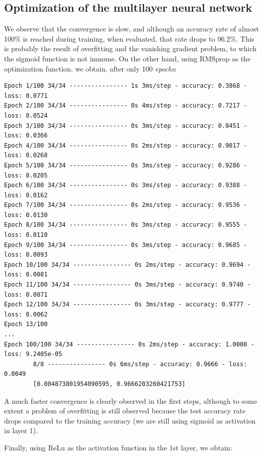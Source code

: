 \documentclass[11pt,a4paper]{article}
\begin{document}
\subsection{Optimization of the multilayer neural network}
We observe that the convergence is slow, and although an accuracy rate of almost 100\% is reached during training, when evaluated, that rate drops to 96.2\%. This is probably the result of overfitting and the vanishing gradient problem, to which the sigmoid function is not immune. On the other hand, using RMSprop as the optimization function, we obtain, after only 100 \textit{epochs}:

{\footnotesize \begin{verbatim}Epoch 1/100 34/34 ---------------- 1s 3ms/step - accuracy: 0.3868 - loss: 0.0771 
Epoch 2/100 34/34 ---------------- 0s 4ms/step - accuracy: 0.7217 - loss: 0.0524
Epoch 3/100 34/34 ---------------- 0s 3ms/step - accuracy: 0.8451 - loss: 0.0366
Epoch 4/100 34/34 ---------------- 0s 2ms/step - accuracy: 0.9017 - loss: 0.0268
Epoch 5/100 34/34 ---------------- 0s 3ms/step - accuracy: 0.9286 - loss: 0.0205
Epoch 6/100 34/34 ---------------- 0s 3ms/step - accuracy: 0.9388 - loss: 0.0162
Epoch 7/100 34/34 ---------------- 0s 2ms/step - accuracy: 0.9536 - loss: 0.0130
Epoch 8/100 34/34 ---------------- 0s 3ms/step - accuracy: 0.9555 - loss: 0.0110
Epoch 9/100 34/34 ---------------- 0s 3ms/step - accuracy: 0.9685 - loss: 0.0093
Epoch 10/100 34/34 ---------------- 0s 2ms/step - accuracy: 0.9694 - loss: 0.0081
Epoch 11/100 34/34 ---------------- 0s 3ms/step - accuracy: 0.9740 - loss: 0.0071
Epoch 12/100 34/34 ---------------- 0s 3ms/step - accuracy: 0.9777 - loss: 0.0062
Epoch 13/100 
...
Epoch 100/100 34/34 ---------------- 0s 2ms/step - accuracy: 1.0000 - loss: 9.2405e-05
        8/8 ---------------- 0s 6ms/step - accuracy: 0.9666 - loss: 0.0049  
        [0.004873801954090595, 0.9666203260421753]
\end{verbatim}} A much faster convergence is clearly observed in the first steps, although to some extent a problem of overfitting is still observed because the test accuracy rate drops compared to the training accuracy (we are still using sigmoid as activation in layer 1).

Finally, using ReLu as the activation function in the 1st layer, we obtain:
\end{document}
